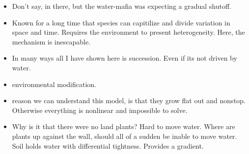 \documentclass[11pt]{article}
\begin{document}
\begin{itemize}
\item Don't say, in there, but the water-mafia was expecting a gradual shutoff.

\item Known for a long time that species can capitilize and divide variation in space and time. Requires the environment to present heterogeneity. Here, the mechanism is inescapable.

\item In many ways all I have shown here is succession. Even if its not driven by water.

\item environmental modification.

\item reason we can understand this model, is that they grow flat out and nonstop. Otherwise everything is nonlinear and impossible to solve.

\item Why is it that there were no land plants? Hard to move water. Where are plants up against the wall, should all of a sudden be inable to move water. Soil holds water with differential tightness. Provides a gradient.
\end{itemize}
\end{document}
